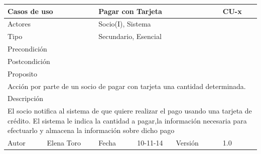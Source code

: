 \documentclass{article}
\begin{document}
\begin{table}[ht]
\begin{tabular}{|l|l|l|l|l|l|}
\hline
\multicolumn{2}{|p{2cm}|}{Casos de uso}  & \multicolumn{3}{p{7cm}|}{Pagar con Tarjeta} & CU-x \\
\hline
\multicolumn{2}{|p{2cm}|}{Actores}       & \multicolumn{4}{p{8cm}|}{Socio(I), Sistema}        \\
\hline
\multicolumn{2}{|p{2cm}|}{Tipo}          & \multicolumn{4}{p{8cm}|}{Secundario, Esencial}        \\
\hline
\multicolumn{2}{|p{2cm}|}{Precondición}  & \multicolumn{4}{p{8cm}|}{}        \\
\hline
\multicolumn{2}{|p{2cm}|}{Postcondición} & \multicolumn{4}{p{8cm}|}{}        \\
\hline
\multicolumn{6}{|p{10cm}|}{Proposito}                                   \\
\hline
\multicolumn{6}{|p{10cm}|}{Acción por parte de un socio de pagar con tarjeta una cantidad determinada.}                                            \\
\hline
\multicolumn{6}{|p{10cm}|}{Descripción}                                 \\
\hline
\multicolumn{6}{|p{10cm}|}{El socio notifica al sistema de que quiere realizar el pago usando una tarjeta de crédito. El sistema le indica la cantidad a pagar,la información necesaria para efectuarlo y almacena la información sobre dicho pago}                                            \\
\hline
Autor           &Elena Toro              & Fecha    &10-11-14     &   Versión  &1.0\\
\hline
\end{tabular}
\end{table}
\end{document}
